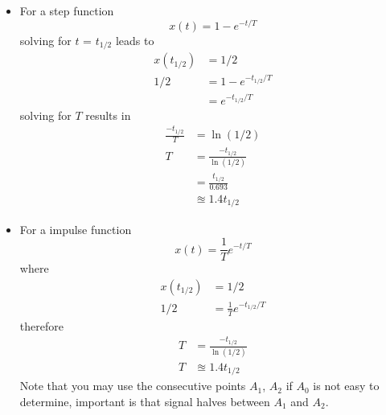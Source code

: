 \documentclass[12pt,letter]{article}
\begin{document}
\begin{itemize}
\begin{figure}[H]
\end{figure}
\begin{itemize}
\item For a step function
\begin{equation}
x(t) = 1-e^{-t/T}
\end{equation}
solving for $t$ = $t_{1/2}$ leads to
\begin{align}
x(t_{1/2}) &= 1/2 \\
1/2 &= 1-e^{-t_{1/2}/T} \nonumber \\
&= e^{-t_{1/2}/T} \nonumber
\end{align}
solving for $T$ results in
\begin{align}
\frac{-t_{1/2}}{T} &= \ln(1/2) \\
T &= \frac{-t_{1/2}}{\ln(1/2)} \nonumber \\
 &= \frac{t_{1/2}}{0.693} \nonumber \\
 &\approxeq 1.4 t_{1/2} \nonumber 
\end{align} 
\item For a impulse function
\begin{equation}
x(t) = \frac{1}{T}e^{-t/T}
\end{equation}
where
\begin{align}
x(t_{1/2}) &= 1/2 \\
1/2 &= \frac{1}{T}e^{-t_{1/2}/T} \nonumber
\end{align}
therefore
\begin{align}
T &= \frac{-t_{1/2}}{\ln(1/2)} \nonumber \\
T &\approxeq 1.4 t_{1/2} \nonumber 
\end{align} 
Note that you may use the consecutive points $A_1$, $A_2$ if $A_0$ is not easy to determine, important is that signal halves between $A_1$ and $A_2$. 




\end{itemize}
\end{itemize}
\end{document}
